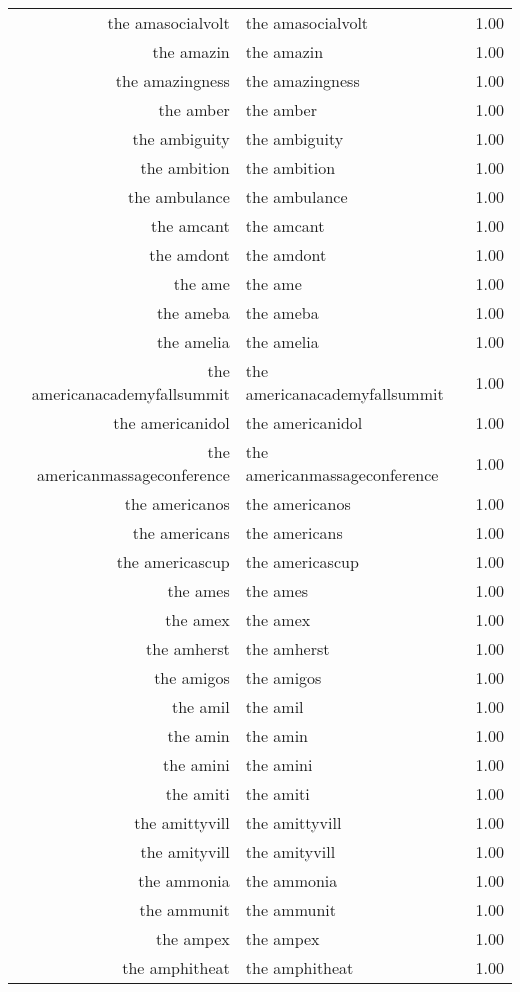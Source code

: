 \begin{table}[ht]
\begin{tabular}{rlr}
  the amasocialvolt & the amasocialvolt & 1.00 \\ 
  the amazin & the amazin & 1.00 \\ 
  the amazingness & the amazingness & 1.00 \\ 
  the amber & the amber & 1.00 \\ 
  the ambiguity & the ambiguity & 1.00 \\ 
  the ambition & the ambition & 1.00 \\ 
  the ambulance & the ambulance & 1.00 \\ 
  the amcant & the amcant & 1.00 \\ 
  the amdont & the amdont & 1.00 \\ 
  the ame & the ame & 1.00 \\ 
  the ameba & the ameba & 1.00 \\ 
  the amelia & the amelia & 1.00 \\ 
  the americanacademyfallsummit & the americanacademyfallsummit & 1.00 \\ 
  the americanidol & the americanidol & 1.00 \\ 
  the americanmassageconference & the americanmassageconference & 1.00 \\ 
  the americanos & the americanos & 1.00 \\ 
  the americans & the americans & 1.00 \\ 
  the americascup & the americascup & 1.00 \\ 
  the ames & the ames & 1.00 \\ 
  the amex & the amex & 1.00 \\ 
  the amherst & the amherst & 1.00 \\ 
  the amigos & the amigos & 1.00 \\ 
  the amil & the amil & 1.00 \\ 
  the amin & the amin & 1.00 \\ 
  the amini & the amini & 1.00 \\ 
  the amiti & the amiti & 1.00 \\ 
  the amittyvill & the amittyvill & 1.00 \\ 
  the amityvill & the amityvill & 1.00 \\ 
  the ammonia & the ammonia & 1.00 \\ 
  the ammunit & the ammunit & 1.00 \\ 
  the ampex & the ampex & 1.00 \\ 
  the amphitheat & the amphitheat & 1.00 \\ 

\end{tabular}
\end{table}
